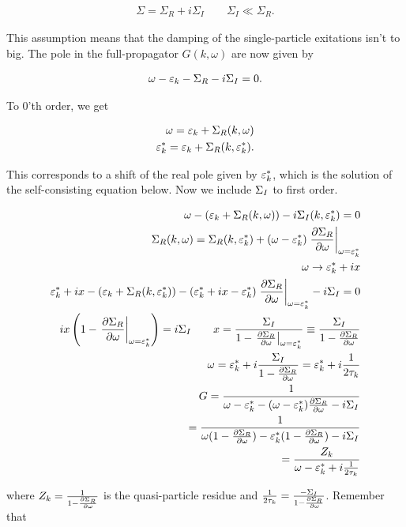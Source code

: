 \begin{align*}
    \Sigma = \Sigma_R + i\Sigma_I \quad \quad \Sigma_I \ll \Sigma_R.
\end{align*}

This assumption means that the damping of the single-particle exitations isn't to big. The pole in the full-propagator $G(k,\omega)$ are now given by 

\begin{align*}
    \omega - \varepsilon_k - \Sigma_R - i\Sigma_I = 0.
\end{align*}

To 0'th order, we get 

\begin{align*}
    \omega = \varepsilon_k + \Sigma_R(k,\omega) \\
    \varepsilon_k^* = \varepsilon_k + \Sigma_R(k, \varepsilon_k^*). 
\end{align*}

This corresponds to a shift of the real pole given by $\varepsilon_k^*$, which is the solution of the self-consisting equation below. Now we include $\Sigma_I$ to first order.

\begin{align*}
    \omega - (\ep_k + \s_R(k,\omega)) - i\s_I(k,\ep_k^*) = 0 \\
    \s_R(k, \omega) = \s_R(k, \ep_k^*) + (\omega - \ep_k^*)\eval{\pdv{\s_R}{\omega}}_{\omega = \ep_k^*} \\ 
    \omega \to \ep_k^* + ix \\ 
    \ep_k^* + ix - (\ep_k + \s_R(k,\ep_k^*)) - (\ep_k^* + ix - \ep_k^*)\eval{\pdv{\s_R}{\omega}}_{\omega = \ep_k^*} -i\s_I = 0 \\ 
    ix\left(1 - \eval{\pdv{\s_R}{\omega}}_{\omega = \ep_k^*}\right) = i\s_I \quad \quad 
    x = \frac{\s_I}{1 - \eval{\pdv{\s_R}{\omega}}_{\omega = \ep_k^*}} \equiv \frac{\s_I}{1 - \pdv{\s_R}{\omega}} \\ 
    \omega = \ep_k^* + i \frac{\s_I}{1 - \pdv{\s_R}{\omega}} = \ep_k^* + i\frac{1}{2\tau_k} \\
    G = \frac{1}{\omega - \ep_k^* - (\omega - \ep_k^*)\pdv{\s_R}{\omega} - i\s_I} \\ 
    = \frac{1}{\omega(1- \pdv{\s_R}{\omega}) - \ep_k^*(1 - \pdv{\s_R}{\omega}) - i\s_I} \\ 
    = \frac{Z_k}{\omega - \ep_k^* +i\frac{1}{2\tau_k}}
\end{align*}

where $Z_k = \frac{1}{1 - \pdv{\Sigma_R}{\omega}}$ is the quasi-particle residue and $\frac{1}{2\tau_k} = \frac{-\Sigma_I}{1 - \pdv{\Sigma_R}{\omega}}$. Remember that \\ 

